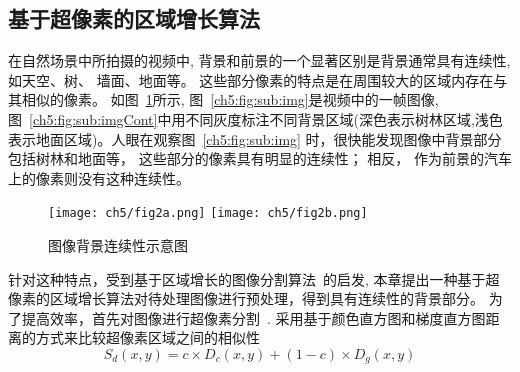 \subsection{基于超像素的区域增长算法}
在自然场景中所拍摄的视频中, 背景和前景的一个显著区别是背景通常具有连续性, 如天空、树、 墙面、地面等。 这些部分像素的特点是在周围较大的区域内存在与其相似的像素。
 如图~\ref{ch5:fig:cont}所示, 图~\ref{ch5:fig:sub:img}是视频中的一帧图像, 图~\ref{ch5:fig:sub:imgCont}中用不同灰度标注不同背景区域(深色表示树林区域,浅色表示地面区域)。人眼在观察图~\ref{ch5:fig:sub:img} 时，很快能发现图像中背景部分包括树林和地面等， 这些部分的像素具有明显的连续性； 相反， 作为前景的汽车上的像素则没有这种连续性。\par

 \begin{figure}[htb]
  \centering%
    {\texttt{[image: ch5/fig2a.png]}}%
 \hspace{1em}%
      {\texttt{[image: ch5/fig2b.png]}}

  \caption{图像背景连续性示意图}\label{ch5:fig:cont}
\end{figure}
 针对这种特点，受到基于区域增长的图像分割算法~\cite{seededRegionGrowing}的启发, 本章提出一种基于超像素的区域增长算法对待处理图像进行预处理，得到具有连续性的背景部分。 为了提高效率，首先对图像进行超像素分割~\cite{superpixel}. 采用基于颜色直方图和梯度直方图距离的方式来比较超像素区域之间的相似性
\begin{equation}\label{ch5:equ:distance}
S_d(x,y) = c \times D_c(x,y) + (1-c) \times D_g(x,y)
\end{equation}

